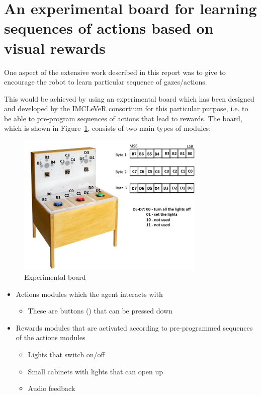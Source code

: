 \section{An experimental board for learning sequences of actions based on visual rewards}
\label{sec:serial_experimental_board}

One aspect of the extensive work described in this report was to give
to encourage the robot to learn particular sequence of gazes/actions.

This would be achieved by using an experimental board which has been
designed and developed by the IMCLeVeR consortium for this particular
purpose, i.e. to be able to pre-program sequences of actions that lead
to rewards. The board, which is shown in
Figure~\ref{fig:experimental_board}, consists of two main types of
modules:

\begin{figure}[htb]
\begin{center}
\includegraphics[width=0.8\textwidth]{lights.jpg}
\end{center}
\caption{Experimental board}
\label{fig:experimental_board}
\end{figure}


\begin{itemize}
\item Actions modules which the agent interacts with
\begin{itemize}
\item These are buttons () that can be pressed down
\end{itemize}
\item Rewards modules that are activated according to pre-programmed
  sequences of the actions modules
\begin{itemize}
\item Lights that switch on/off
\item Small cabinets with lights that can open up
\item Audio feedback
\end{itemize}
\end{itemize}

